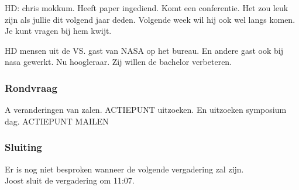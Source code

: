 HD: chris mokkum. Heeft paper ingediend. Komt een conferentie. Het zou leuk zijn als jullie dit volgend jaar deden. Volgende week wil hij ook wel langs komen. Je kunt vragen bij hem kwijt. 

HD mensen uit de VS. gast van NASA op het bureau. En andere gast ook bij nasa gewerkt. Nu hoogleraar. Zij willen de bachelor verbeteren.

\subsubsection{Rondvraag}
A veranderingen van zalen. ACTIEPUNT uitzoeken. En uitzoeken symposium dag. ACTIEPUNT MAILEN

\subsubsection{Sluiting}
Er is nog niet besproken wanneer de volgende vergadering zal zijn.\\

Joost sluit de vergadering om 11:07.\\

